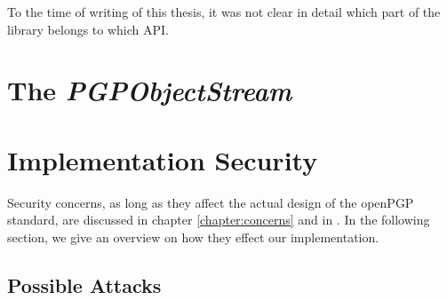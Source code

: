 To the time of writing of this thesis, it was not clear in detail which part of the library belongs to which API. 

\section{The \textit{PGPObjectStream}}



%
%
%
%
%
%

\section{Implementation Security}

Security concerns, as long as they affect the actual design of the openPGP standard, are discussed in chapter \ref{chapter:concerns} and in \citep[section 14]{RFC4880}. In the following section, we give an overview on how they effect our implementation. 

\subsection{Possible Attacks}










